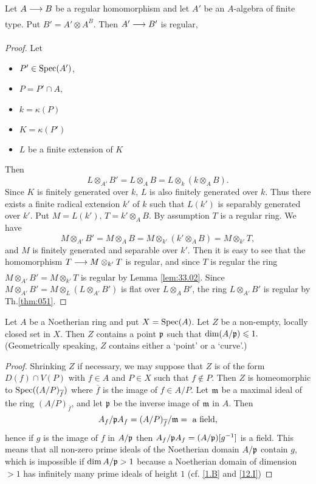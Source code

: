 \documentclass[../main]{subfiles}
\begin{document}
\begin{lemma}\label{lem:33.04}
 Let $A \varrightarrow{} B$ be a regular homomorphism and let $A'$ be an $A$-algebra of finite type. Put $B'=A' \otimes A^B$. Then $A' \varrightarrow{} B'$ is regular,
\end{lemma}
\begin{proof}
 Let 
 \begin{itemize}
     \item $P' \in \operatorname{Spec}(A')$, 
     \item $P=P' \cap A$,
     \item $k=\kappa(P)$
     \item $K=\kappa(P')$
     \item $L$ be a finite extension of $K$
 \end{itemize}
 Then \[L \otimes_{A'} B'=L \otimes_A B=L \otimes_k(k \otimes_A B).\] Since $K$ is finitely generated over $k$, $L$ is also finitely generated over $k$. Thus there exists a finite radical extension $k'$ of $k$ such that $L(k')$ is separably generated over $k'$. Put $M=L(k'), \, T=k' \otimes_A B $. By assumption $T$ is a regular ring. We have \[M \otimes_{A'} B'=M \otimes_A B=M \otimes_{k'} (k' \otimes_A B)=M \otimes_{k'} T,\] and $M$ is finitely generated and separable over $k'$. Then it is easy to see that the homomorphism $T \varrightarrow{} M \otimes_{k'} T$ is regular, and since $T$ is regular the ring $M \otimes_{A'} B'=M \otimes_{k'} T$ is regular by Lemma \ref{lem:33.02}. Since $M \otimes_{A'} B'=M \otimes_L(L \otimes_{A'} B')$ is flat over $L \otimes_A B'$, the ring $L \otimes_{A'} B'$ is regular by Th.\ref{thm:051}.
\end{proof}

\begin{parlemma}\label{lem:33.05} Let $A$ be a Noetherian ring and put $X=\operatorname{Spec}(A)$. Let $Z$ be a non-empty, locally closed set in $X .$
Then $Z$ contains a point $\mathfrak{p}$ such that $\operatorname{dim}(A / \mathfrak{p}) \leqslant 1 .$ (Geometrically speaking, $Z$ contains either a `point' or a `curve'.)
\end{parlemma}
\begin{proof}Shrinking $Z$ if necessary, we may suppose that $Z$ is
of the form \newline $D(f) \cap V(P)$ with $f \in A$ and $P \in X$ such that $f \notin P$.
Then $Z$ is homeomorphic to $\operatorname{Spec}((A / P)_{\overline{f}})$ where $\overline{f}$ is the image
of $f \in A / P$. Let $\mathfrak{m}$ be a maximal ideal of the ring $(A / P)_{\overline{f}}$,
and let $\mathfrak{p}$ be the inverse image of $\mathfrak{m}$ in $A$. Then
\[A_f / \mathfrak{p} A_f=(A / P)_{\overline{f}} / \mathfrak{m}=\text{ a field,}\]
hence if $g$ is the image of $f$ in $A / \mathfrak{p}$ then $A_f / \mathfrak{p} A_f=(A / \mathfrak{p})[g^{-1}]$
is a field. This means that all non-zero prime ideals of the
Noetherian domain $A / \mathfrak{p}$ contain $g$, which is impossible if
$\operatorname{dim} A / \mathfrak{p}>1$ because a Noetherian domain of dimension $>1$ has
infinitely many prime ideals of height $1$ (cf. \ref{1.B} and \ref{12.I})\end{proof}
\end{document}

